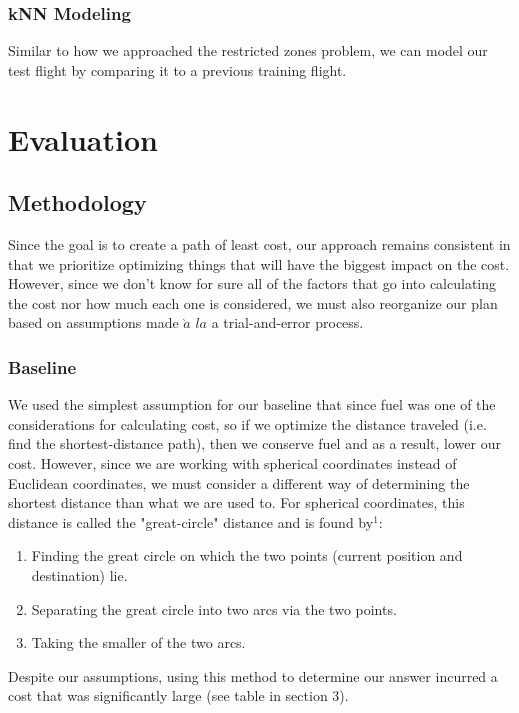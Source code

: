 \documentclass{article}[12pt]
\begin{document}
\begin{multicols}{2}
\subsubsection{kNN Modeling}

Similar to how we approached the restricted zones problem, we can model our test flight by comparing it to a previous training flight. 

\section{Evaluation}
\subsection{Methodology}
Since the goal is to create a path of least cost, our approach remains consistent in that we prioritize optimizing things that will have the biggest impact on the cost. However, since we don't know for sure all of the factors that go into calculating the cost nor how much each one is considered, we must also reorganize our plan based on assumptions made $\grave{a}$ $la$ a trial-and-error process.

\subsubsection{Baseline}

We used the simplest assumption for our baseline that since fuel was one of the considerations for calculating cost, so if we optimize the distance traveled (i.e. find the shortest-distance path), then we conserve fuel and as a result, lower our cost. However, since we are working with spherical coordinates instead of Euclidean coordinates, we must consider a different way of determining the shortest distance than what we are used to. For spherical coordinates, this distance is called the "great-circle" distance and is found by$^{1}$:\\

	\begin{enumerate}
		\item Finding the great circle on which the two points (current position and destination) lie.
		\item Separating the great circle into two arcs via the two points. 
		\item Taking the smaller of the two arcs.\\
	\end{enumerate}

Despite our assumptions, using this method to determine our answer incurred a cost that was significantly large (see table in section 3).



\end{multicols}
\end{document}
